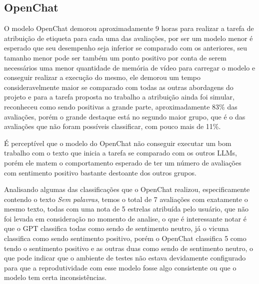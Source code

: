 \subsection{OpenChat}
\label{sec:resultados:subsec:openchat}


O modelo OpenChat demorou aproximadamente 9 horas para realizar a tarefa de atribuição de etiqueta para cada uma das avaliações, por ser um modelo menor é esperado que seu desempenho seja inferior se comparado com os anteriores, seu tamanho menor pode ser também um ponto positivo por conta de serem necessários uma menor quantidade de memória de vídeo para carregar o modelo e conseguir realizar a execução do mesmo, ele demorou um tempo consideravelmente maior se comparado com todas as outras abordagens do projeto e para a tarefa proposta no trabalho a atribuição ainda foi simular, reconheceu como sendo positivas a grande parte, aproximadamente 83\% das avaliações, porém o grande destaque está no segundo maior grupo, que é o das avaliações que não foram possíveis classificar, com pouco mais de 11\%.

É perceptível que o modelo do OpenChat não conseguir executar um bom trabalho com o texto que inicia a tarefa se comparado com os outros LLMs, porém ele matem o comportamento esperado de ter um número de avaliações com sentimento positivo bastante destoante dos outros grupos.

Analisando algumas das classificações que o OpenChat realizou, especificamente contendo o texto \textit{Sem palavras}, temos o total de 7 avaliações com exatamente o mesmo texto, todas com uma nota de 5 estrelas atribuída pelo usuário, que não foi levada em consideração no momento de analise, o que é interessante notar é que o GPT classifica todas como sendo de sentimento neutro, já o vicuna classifica como sendo sentimento positivo, porém o OpenChat classifica 5 como tendo o sentimento positivo e as outras duas como sendo de sentimento neutro, o que pode indicar que o ambiente de testes não estava devidamente configurado para que a reprodutividade com esse modelo fosse algo consistente ou que o modelo tem certa inconsistências.


